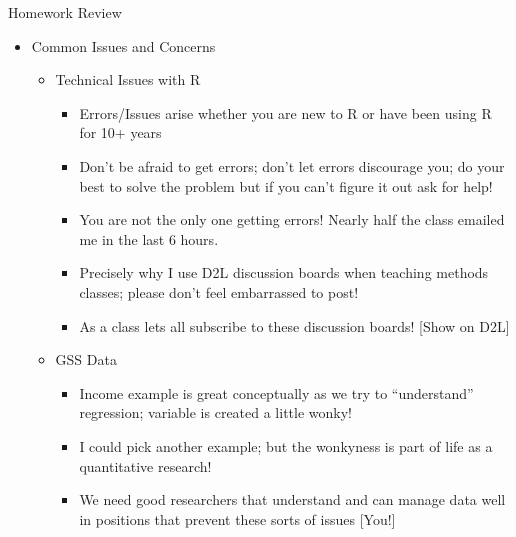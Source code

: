 \documentclass[
  8pt,
  ignorenonframetext,
  dvipsnames]{beamer}
\providecommand{\tightlist}{%
  \setlength{\itemsep}{0pt}\setlength{\parskip}{0pt}}
\let\olditem\item
\renewcommand{\item}{%
  \olditem\vspace{4pt}
}
\begin{document}
\begin{frame}{Homework Review}
\protect\hypertarget{homework-review}{}

\begin{itemize}
\tightlist
\item
  Common Issues and Concerns

  \begin{itemize}
  \tightlist
  \item
    Technical Issues with R

    \begin{itemize}
    \tightlist
    \item
      Errors/Issues arise whether you are new to R or have been using R
      for 10+ years
    \item
      Don't be afraid to get errors; don't let errors discourage you; do
      your best to solve the problem but if you can't figure it out ask
      for help!
    \item
      You are not the only one getting errors! Nearly half the class
      emailed me in the last 6 hours.
    \item
      Precisely why I use D2L discussion boards when teaching methods
      classes; please don't feel embarrassed to post!
    \item
      As a class lets all subscribe to these discussion boards! {[}Show
      on D2L{]}
    \end{itemize}
  \item
    GSS Data

    \begin{itemize}
    \tightlist
    \item
      Income example is great conceptually as we try to ``understand''
      regression; variable is created a little wonky!
    \item
      I could pick another example; but the wonkyness is part of life as
      a quantitative research!
    \item
      We need good researchers that understand and can manage data well
      in positions that prevent these sorts of issues {[}You!{]}
    \end{itemize}
  \end{itemize}
\end{itemize}

\end{frame}
\end{document}
